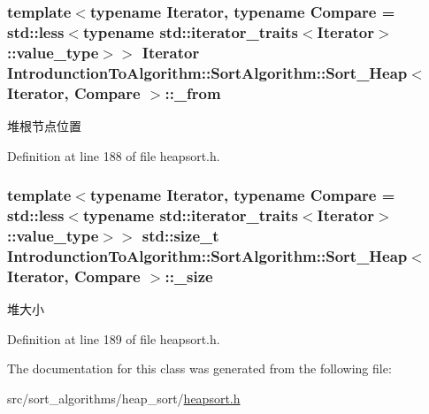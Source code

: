 \subsubsection[{\+\_\+from}]{\setlength{\rightskip}{0pt plus 5cm}template$<$typename Iterator, typename Compare = std\+::less$<$typename std\+::iterator\+\_\+traits$<$\+Iterator$>$\+::value\+\_\+type$>$$>$ Iterator {\bf Introdunction\+To\+Algorithm\+::\+Sort\+Algorithm\+::\+Sort\+\_\+\+Heap}$<$ Iterator, Compare $>$\+::\+\_\+from\hspace{0.3cm}{\ttfamily [private]}}\label{class_introdunction_to_algorithm_1_1_sort_algorithm_1_1_sort___heap_a7f6c20382257308edd2c0049ec46ad66}
堆根节点位置 

Definition at line 188 of file heapsort.\+h.

\hypertarget{class_introdunction_to_algorithm_1_1_sort_algorithm_1_1_sort___heap_a3cbf6e8a1972cc62bce0b50226024a52}{}
\subsubsection[{\+\_\+size}]{\setlength{\rightskip}{0pt plus 5cm}template$<$typename Iterator, typename Compare = std\+::less$<$typename std\+::iterator\+\_\+traits$<$\+Iterator$>$\+::value\+\_\+type$>$$>$ std\+::size\+\_\+t {\bf Introdunction\+To\+Algorithm\+::\+Sort\+Algorithm\+::\+Sort\+\_\+\+Heap}$<$ Iterator, Compare $>$\+::\+\_\+size\hspace{0.3cm}{\ttfamily [private]}}\label{class_introdunction_to_algorithm_1_1_sort_algorithm_1_1_sort___heap_a3cbf6e8a1972cc62bce0b50226024a52}
堆大小 

Definition at line 189 of file heapsort.\+h.



The documentation for this class was generated from the following file\+:\begin{DoxyCompactItemize}
\item 
src/sort\+\_\+algorithms/heap\+\_\+sort/\hyperlink{heapsort_8h}{heapsort.\+h}\end{DoxyCompactItemize}
